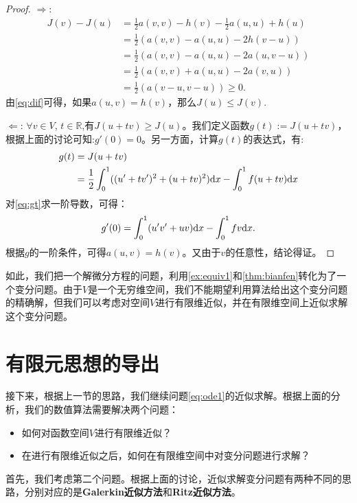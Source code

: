 \begin{proof}
  $\Rightarrow$:
  \begin{equation}
    \label{eq:dif}
    \begin{aligned}
      J(v)-J(u)&=\frac{1}{2}a(v,v)-h(v)-\frac{1}{2}a(u,u)+h(u)\\
      &=\frac{1}{2}(a(v,v)-a(u,u)-2h(v-u))\\
      &=\frac{1}{2}(a(v,v)-a(u,u)-2a(u,v-u))\\
      &=\frac{1}{2}(a(v,v)+a(u,u)-2a(v,u))\\
      &=\frac{1}{2}(a(v-u,v-u))\ge0.
    \end{aligned}
  \end{equation}
  由\eqref{eq:dif}可得，如果$a(u,v)=h(v)$，那么$J(u)\le J(v)$.

  $\Leftarrow$: $\forall v\in V$, $t\in\mathbb{R}$,有$J(u+tv)\ge J(u)$。我们定义函数$g(t):=J(u+tv)$，根据上面的讨论可知:$g'(0)=0$。另一方面，计算$g(t)$的表达式，有:
  \begin{equation}
    \begin{aligned}
      \label{eq:gt}
      g(t)&=J(u+tv)\\
      &=\frac{1}{2}\int_{0}^{1}((u'+tv'
      )^{2}+(u+tv)^{2})\mathrm{d} x-\int_{0}^{1}f(u+tv)\mathrm{d} x\\
    \end{aligned}
  \end{equation}
  对\eqref{eq:gt}求一阶导数，可得：
  \begin{equation}
    \label{eq:dirg0}
    g'(0)=\int_{0}^{1}(u'v'+uv)\mathrm{d} x-\int_{0}^{1}fv\mathrm{d} x.
  \end{equation}
  根据$g$的一阶条件，可得$a(u,v)=h(v)$。又由于$v$的任意性，结论得证。
\end{proof}

如此，我们把一个解微分方程的问题，利用\ref{ex:equiv1}和\ref{thm:bianfen}转化为了一个变分问题。由于$V$是一个无穷维空间，我们不能期望利用算法给出这个变分问题的精确解，但我们可以考虑对空间$V$进行有限维近似，并在有限维空间上近似求解这个变分问题。

\section{有限元思想的导出}
接下来，根据上一节的思路，我们继续问题\eqref{eq:ode1}的近似求解。根据上面的分析，我们的数值算法需要解决两个问题：
\begin{itemize}
  \item 如何对函数空间$V$进行有限维近似？
  \item 在进行有限维近似之后，如何在有限维空间中对变分问题进行求解？
\end{itemize}
首先，我们考虑第二个问题。根据上面的讨论，近似求解变分问题有两种不同的思路，分别对应的是\textbf{Galerkin近似方法}和\textbf{Ritz近似方法}。
